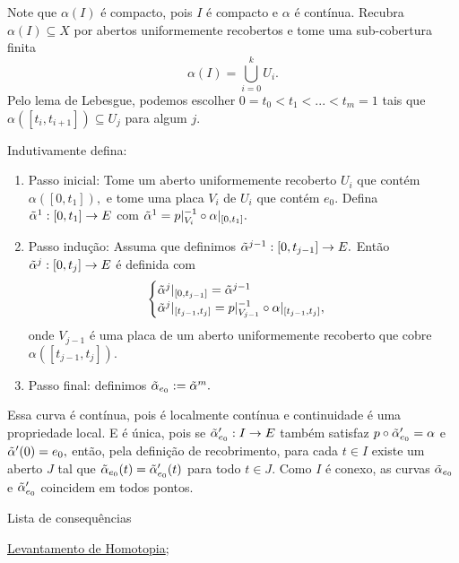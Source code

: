 \begin{dem}
    Note que $\alpha(I)$ é compacto, pois $I$ é compacto e $\alpha$ é contínua. Recubra $\alpha(I)\subseteq X$ por abertos uniformemente recobertos e tome uma sub-cobertura finita
    \[\alpha(I)=\bigcup_{i=0}^k U_i. \]
    Pelo lema de Lebesgue, podemos escolher $0=t_0< t_1<...<t_m=1$ tais que $\alpha([t_i,t_{i+1}])\subseteq U_j$ para algum $j.$ 
    
    Indutivamente defina: 
    \begin{enumerate}
        \item Passo inicial: Tome um aberto uniformemente recoberto $U_i$ que contém $\alpha([0,t_1]),$ e tome uma placa $V_i$ de $U_i$ que contém $e_0.$ Defina $\Tilde{\alpha}^1:[0,t_1]\rightarrow E$ com $\Tilde{\alpha}^1=p|_{V_i}^{-1}\circ \alpha|_{[0,t_1]}.$
        \item Passo indução: Assuma que definimos $\Tilde{\alpha}^{j-1}:[0,t_{j-1}]\rightarrow E.$ Então $\Tilde{\alpha}^j:[0,t_j]\rightarrow E$ é definida com 
        \begin{align*}
            \begin{cases}
                \Tilde{\alpha}^j|_{[0,t_{j-1}]}=\Tilde{\alpha}^{j-1}\\
                \Tilde{\alpha}^j|_{[t_{j-1},t_j]}=p|_{V_{j-1}}^{-1}\circ \alpha|_{[t_{j-1},t_j]},
            \end{cases}
        \end{align*}
        onde $V_{j-1}$ é uma placa de um aberto uniformemente recoberto que cobre $\alpha([t_{j-1},t_j]).$
        \item Passo final: definimos $\Tilde{\alpha}_{e_0}:=\Tilde{\alpha}^m.$
    \end{enumerate}

    Essa curva é contínua, pois é localmente contínua e continuidade é uma propriedade local. E é única, pois se $\Tilde{\alpha}_{e_0}':I\rightarrow E$ também satisfaz $p\circ\Tilde{\alpha}_{e_0}'=\alpha$ e $\Tilde{\alpha}'(0)=e_0,$ então, pela definição de recobrimento, para cada $t\in I$ existe um aberto $J$ tal que $\Tilde{\alpha}_{e_0}(t)=\Tilde{\alpha}_{e_0}'(t)$ para todo $t\in J$. Como $I$ é conexo, as curvas $\Tilde{\alpha}_{e_0}$ e $\Tilde{\alpha}_{e_0}'$ coincidem em todos pontos.
\end{dem}

\begin{titlemize}{Lista de consequências}
	\item \hyperref[levantamento-de-homotopia-prop]{Levantamento de Homotopia};\\ %
	\item \hyperref[]{}
\end{titlemize}
